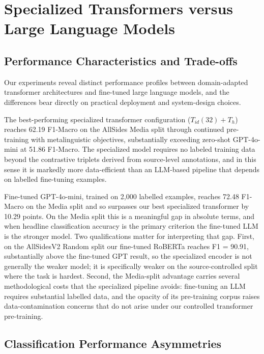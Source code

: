 \section{Specialized Transformers versus Large Language Models}
\label{sec:comparative-analysis}

\subsection{Performance Characteristics and Trade-offs}

Our experiments reveal distinct performance profiles between domain-adapted transformer architectures and fine-tuned large language models, and the differences bear directly on practical deployment and system-design choices.

The best-performing specialized transformer configuration ($T_{id}(32) + T_h$) reaches 62.19 F1-Macro on the AllSides Media split through continued pre-training with metalinguistic objectives, substantially exceeding zero-shot GPT-4o-mini at 51.86 F1-Macro. The specialized model requires no labeled training data beyond the contrastive triplets derived from source-level annotations, and in this sense it is markedly more data-efficient than an LLM-based pipeline that depends on labelled fine-tuning examples.

Fine-tuned GPT-4o-mini, trained on 2,000 labelled examples, reaches 72.48 F1-Macro on the Media split and so surpasses our best specialized transformer by 10.29 points. On the Media split this is a meaningful gap in absolute terms, and when headline classification accuracy is the primary criterion the fine-tuned LLM is the stronger model. Two qualifications matter for interpreting that gap. First, on the AllSidesV2 Random split our fine-tuned RoBERTa reaches F1 = 90.91, substantially above the fine-tuned GPT result, so the specialized encoder is not generally the weaker model; it is specifically weaker on the source-controlled split where the task is hardest. Second, the Media-split advantage carries several methodological costs that the specialized pipeline avoids: fine-tuning an LLM requires substantial labelled data, and the opacity of its pre-training corpus raises data-contamination concerns that do not arise under our controlled transformer pre-training.

\subsection{Classification Performance Asymmetries}

